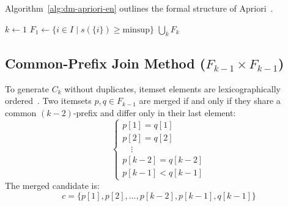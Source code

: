 Algorithm~\ref{alg:dm-apriori-en} outlines the formal structure of Apriori~\cite{agrawal1994, tan2018}.

\begin{algorithm}[htbp]
\SetAlgoLined
\caption{Apriori Algorithm for Frequent Itemset Mining}
\label{alg:dm-apriori-en}
\KwInput{Transaction database $T$, minimum support threshold $\mathrm{minsup} \in (0, 1]$.}
\BlankLine
$k \leftarrow 1$\;
$F_1 \leftarrow \{ i \in I \mid s(\{i\}) \ge \mathrm{minsup} \}$ 
\Return $\bigcup_k F_k$\;
\end{algorithm}

\subsection{Common-Prefix Join Method ($F_{k-1} \times F_{k-1}$)}
To generate $C_k$ without duplicates, itemset elements are lexicographically ordered~\cite{agrawal1994}. Two itemsets $p, q \in F_{k-1}$ are merged if and only if they share a common $(k-2)$-prefix and differ only in their last element:
\begin{equation}
\label{eq:dm-prefix-join-condition-en}
\begin{cases}
p[1] = q[1] \\
p[2] = q[2] \\
\quad \vdots \\
p[k-2] = q[k-2] \\
p[k-1] < q[k-1]
\end{cases}
\end{equation}
The merged candidate is:
\begin{equation}
c = \{p[1], p[2], \dots, p[k-2], p[k-1], q[k-1]\}
\end{equation}

